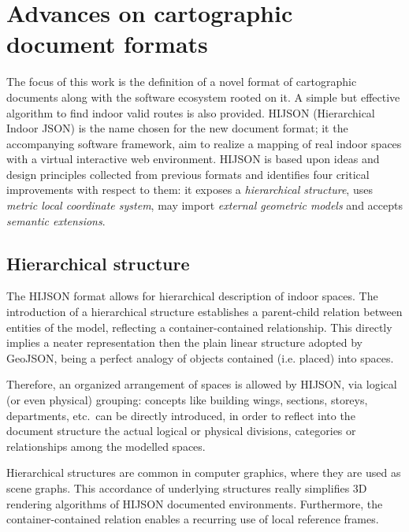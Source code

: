 
\section{Advances on cartographic\\ document formats}\label{advances-on-cartographic-document-format}
\label{advances}

The focus of this work is the definition of a novel format of cartographic
documents along with the software ecosystem rooted on it. A simple but
effective algorithm to find indoor valid routes is also provided. HIJSON
(Hierarchical Indoor JSON) is the name chosen for the new document format; 
it the accompanying software framework, aim to realize a
mapping of real indoor spaces with a virtual interactive web environment.
HIJSON is based upon ideas and design principles collected from previous
formats and identifies four critical improvements with respect to them: it
exposes a \emph{hierarchical structure}, uses \emph{metric local coordinate
system}, may import \emph{external geometric models} and accepts \emph{semantic
extensions}. 

\subsection{Hierarchical structure}\label{hierarchical-structure}

The HIJSON format allows for hierarchical description of indoor spaces. The
introduction of a hierarchical structure establishes a parent-child relation
between entities of the model, reflecting a container-contained relationship.
This directly implies a neater representation then the plain linear structure
adopted by GeoJSON, being a perfect analogy of objects contained (i.e.
placed) into spaces.

Therefore, an organized arrangement of spaces is allowed by HIJSON, via
logical (or even physical) grouping: concepts like building wings, sections,
storeys, departments, etc.~can be directly introduced, in order to reflect
into the document structure the actual logical or physical divisions,
categories or relationships among the modelled spaces.

Hierarchical structures are common in computer graphics, where they are used
as scene graphs. This accordance of underlying structures really simplifies 3D
rendering algorithms of HIJSON documented environments. Furthermore, the
container-contained relation enables a recurring use of local reference
frames.

